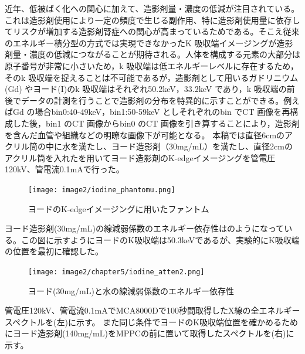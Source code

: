 近年、低被ばく化への関心に加えて、造影剤量・濃度の低減が注目されている。これは造影剤使用により一定の頻度で生じる副作用、特に造影剤使用量に依存してリスクが増加する造影剤腎症への関心が高まっているためである。そこえ従来のエネルギー積分型の方式では実現できなかったK 吸収端イメージングが造影剤量・濃度の低減につながることが期待される。人体を構成する元素の大部分は原子番号が非常に小さいため，k 吸収端は低エネルギーレベルに存在するため，そのk 吸収端を捉えることは不可能であるが，造影剤として用いるガドリニウム(Gd) やヨード(I)のk 吸収端はそれぞれ50.2keV，33.2keV であり，k 吸収端の前後でデータの計測を行うことで造影剤の分布を特異的に示すことができる。例えばGd の場合bin0:40-49keV，bin1:50-59keV としそれぞれのbin でCT 画像を再構成した後，bin1 のCT 画像からbin0 のCT 画像を引き算することにより，造影剤を含んだ血管や組織などの明瞭な画像下が可能となる。
本稿では直径6cmのアクリル筒の中に水を満たし、ヨード造影剤（30mg/mL）を満たし、直径2cmのアクリル筒を入れたを用いてヨード造影剤のK-edgeイメージングを管電圧120kV、管電流0.1mAで行った。

\begin{figure}[H]
 \begin{center}
 \texttt{[image: image2/iodine\_phantomu.png]} 
 \end{center}
 \caption{ヨードのK-edgeイメージングに用いたファントム}
 \label{fig:Iodine_phantom}
\end{figure}

ヨード造影剤(30mg/mL)の線減弱係数のエネルギー依存性はのようになっている。この図に示すようにヨードのK吸収端は50.3keVであるが、実験的にK吸収端の位置を最初に確認した。


\begin{figure}[H]
 \begin{center}
 \texttt{[image: image2/chapter5/iodine\_atten2.png]} 
 \end{center}
 \caption{ヨード(30mg/mL)と水の線減弱係数のエネルギー依存性}
 \label{fig:iodine_atten}
\end{figure}


管電圧120kV、管電流0.1mAでMCA8000Dで100秒間取得したX線の全エネルギースペクトルを(左)に示す。
また同じ条件でヨードのK吸収端位置を確かめるためにヨード造影剤(140mg/mL)をMPPCの前に置いて取得したスペクトルを(右)に示す。


